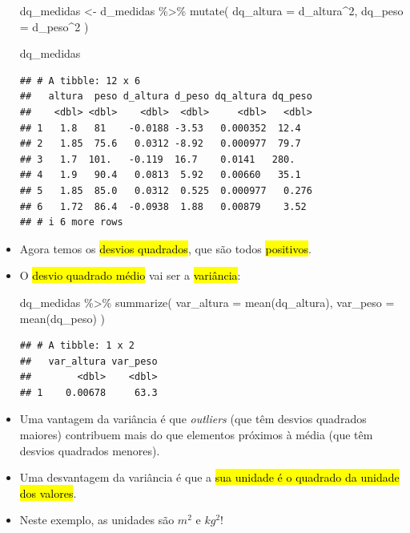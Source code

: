 \documentclass[
  11pt]{report}
\newenvironment{Shaded}{\begin{snugshade}}{\end{snugshade}}
\newcommand{\AttributeTok}[1]{\textcolor[rgb]{0.77,0.63,0.00}{#1}}
\newcommand{\DecValTok}[1]{\textcolor[rgb]{0.00,0.00,0.81}{#1}}
\newcommand{\FunctionTok}[1]{\textcolor[rgb]{0.00,0.00,0.00}{#1}}
\newcommand{\NormalTok}[1]{#1}
\newcommand{\OtherTok}[1]{\textcolor[rgb]{0.56,0.35,0.01}{#1}}
\newcommand{\SpecialCharTok}[1]{\textcolor[rgb]{0.00,0.00,0.00}{#1}}
\renewenvironment{Shaded}{
    \begin{mdframed}[%
      roundcorner=2pt,%
      innerleftmargin=5pt,%
      innerrightmargin=5pt,%
      topline=true,%
      leftline=true,%
      rightline=true,%
      bottomline=true,%
      linewidth=0.5pt,%
      linecolor=black!20,%
      backgroundcolor=black!2,%
      skipabove=2ex,%
      skipbelow=2.5ex%
    ]%
  }
  {
    \end{mdframed}
  }
\begin{document}
\begin{itemize}
\begin{Shaded}
\begin{Highlighting}[]
\NormalTok{dq\_medidas }\OtherTok{\textless{}{-}}\NormalTok{ d\_medidas }\SpecialCharTok{\%\textgreater{}\%} 
  \FunctionTok{mutate}\NormalTok{(}
    \AttributeTok{dq\_altura =}\NormalTok{ d\_altura}\SpecialCharTok{\^{}}\DecValTok{2}\NormalTok{,}
    \AttributeTok{dq\_peso =}\NormalTok{ d\_peso}\SpecialCharTok{\^{}}\DecValTok{2}
\NormalTok{  )}

\NormalTok{dq\_medidas}
\end{Highlighting}
\end{Shaded}

\begin{verbatim}
## # A tibble: 12 x 6
##   altura  peso d_altura d_peso dq_altura dq_peso
##    <dbl> <dbl>    <dbl>  <dbl>     <dbl>   <dbl>
## 1   1.8   81    -0.0188 -3.53   0.000352  12.4  
## 2   1.85  75.6   0.0312 -8.92   0.000977  79.7  
## 3   1.7  101.   -0.119  16.7    0.0141   280.   
## 4   1.9   90.4   0.0813  5.92   0.00660   35.1  
## 5   1.85  85.0   0.0312  0.525  0.000977   0.276
## 6   1.72  86.4  -0.0938  1.88   0.00879    3.52 
## # i 6 more rows
\end{verbatim}
\item
  Agora temos os {\hl{desvios quadrados}}, que são todos {\hl{positivos}}.
\item
  O {\hl{desvio quadrado médio}} vai ser a {\hl{variância}}:

\begin{Shaded}
\begin{Highlighting}[]
\NormalTok{dq\_medidas }\SpecialCharTok{\%\textgreater{}\%} 
  \FunctionTok{summarize}\NormalTok{(}
    \AttributeTok{var\_altura =} \FunctionTok{mean}\NormalTok{(dq\_altura),}
    \AttributeTok{var\_peso =} \FunctionTok{mean}\NormalTok{(dq\_peso)}
\NormalTok{  )}
\end{Highlighting}
\end{Shaded}

\begin{verbatim}
## # A tibble: 1 x 2
##   var_altura var_peso
##        <dbl>    <dbl>
## 1    0.00678     63.3
\end{verbatim}
\item
  Uma vantagem da variância é que \emph{outliers} (que têm desvios quadrados maiores) contribuem mais do que elementos próximos à média (que têm desvios quadrados menores).
\item
  Uma desvantagem da variância é que a {\hl{sua unidade é o quadrado da unidade dos valores}}.
\item
  Neste exemplo, as unidades são $m^2$ e $kg^2$!
\end{itemize}
\end{document}
